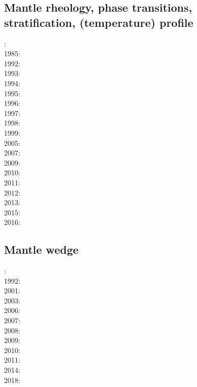 \subsection*{Mantle rheology, phase transitions, stratification, (temperature) profile}

: \cite{yusb82}\cite{chri82}\\
1985: \cite{chyu85}\\
1992: \cite{zhyh92}\\
1993: \cite{tasg93}\cite{best93}\cite{kief93}\\
1994: \cite{vayv94}\cite{zhgu94b}\\
1995: \cite{zhyu95}\cite{chri95}\cite{scta95}\\
1996: \cite{pelt96}\cite{mitr96}\\
1997: \cite{mifo97}\\
1998: \cite{cava98}\\
1999: \cite{sigh99}\\
2005: \cite{hett05}\\
2007: \cite{pazw07}\cite{mofm07}\\
2009: \cite{natd09}\\
2010: \cite{kayy10}\\
2011: \cite{java11}\cite{faff11}\cite{nata11}\\
2012: \cite{tack12}\cite{sato12}\\
2013: \cite{fakc13}\cite{taab13}\\
2015: \cite{basn15}\\
2016: \cite{tiro16}\cite{beci16}

\subsection*{Mantle wedge} 

: \cite{tosl78}\\
1992: \cite{dast92}\\
2001: \cite{bigu01}\cite{haki01}\\
2003: \cite{vank03}\\
2006: \cite{gogc06}\cite{gecy06}\\
2007: \cite{gogc07}\cite{knvk07}\cite{lohd07}\\
2008: \cite{knva08}\cite{cage08}\\
2009: \cite{leki09}\cite{heaa09}\\
2010: \cite{roms10}\cite{hogz10}\\
2011: \cite{zhgh11}\\
2014: \cite{ledg14}\cite{mabv14}\\
2018: \cite{pltv18}

